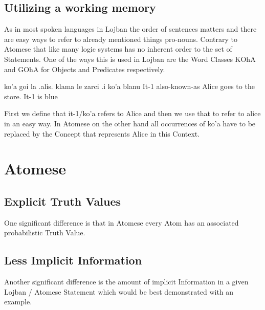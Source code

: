 \subsection{Utilizing a working memory}

As in most spoken languages in Lojban the order of sentences matters and there are easy ways to refer to already mentioned things pro-nouns. Contrary to Atomese that like many logic systems has no inherent order to the set of Statements.
One of the ways this is used in Lojban are the Word Classes KOhA and GOhA for Objects and Predicates respectively.

\begin{center}
    ko’a goi la .alis. klama le zarci .i ko’a blanu
    It-1 also-known-as Alice goes to the store. It-1 is blue
\end{center}

First we define that it-1/ko’a refers to Alice and then we use that to refer to alice in an easy way. In Atomese on the other hand all occurrences of ko’a have to be replaced by the Concept that represents Alice in this Context.

\section{Atomese}

\subsection{Explicit Truth Values}

One significant difference is that in Atomese every Atom has an associated probabilistic Truth Value.

\subsection{Less Implicit Information}

Another significant difference is the amount of implicit Information in a given Lojban / Atomese Statement which would be best demonstrated with an example.

